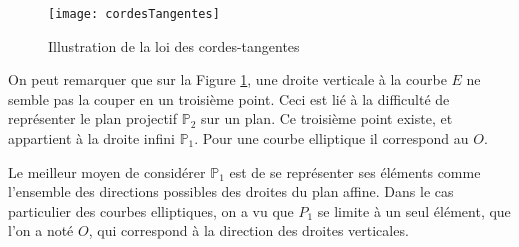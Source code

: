 \begin{figure}[h]
    \centering
    \texttt{[image: cordesTangentes]}
    \caption{Illustration de la loi des cordes-tangentes}
    \label{fig:cordesTangentes}
\end{figure}

On peut remarquer que sur la Figure \ref{fig:cordesTangentes}, une droite verticale
à la courbe $E$ ne semble
pas la couper en un troisième point. Ceci est lié à la difficulté de représenter le plan
projectif $\mathbb{P}_{2}$ sur un plan. Ce troisième point existe, et appartient à la droite infini
$\mathbb{P}_{1}$. Pour une courbe elliptique il correspond au $O$.

\begin{remarque}
    Le meilleur moyen de considérer $\mathbb{P}_{1}$ est de se représenter ses éléments comme
    l'ensemble des directions possibles des droites du plan affine. Dans le cas particulier
    des courbes elliptiques, on a vu que $P_{1}$ se limite à un seul élément, que l'on a noté
    $O$, qui correspond à la direction des droites verticales.
\end{remarque}

